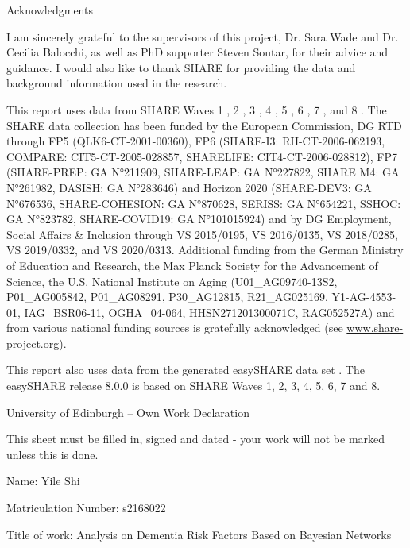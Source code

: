 \documentclass[11pt,twoside]{article}
\numberwithin{Theorem}{section}
\numberwithin{Definition}{section}
\numberwithin{Lemma}{section}
\numberwithin{Algorithm}{section}
\numberwithin{equation}{section}
\begin{document}
\clearpage

\begin{center}
\Large{Acknowledgments}
\end{center}

I am sincerely grateful to the supervisors of this project, Dr. Sara Wade and Dr. Cecilia Balocchi, as well as PhD supporter Steven Soutar, for their advice and guidance. I would also like to thank SHARE for providing the data and background information used in the research. 

This report uses data from SHARE Waves 1 \cite{share1}, 2 \cite{share2}, 3 \cite{share3}, 4 \cite{share4}, 5 \cite{share5}, 6 \cite{share6}, 7 \cite{share7}, and 8 \cite{share8}. The SHARE data collection has been funded by the European Commission, DG RTD through FP5 (QLK6-CT-2001-00360), FP6 (SHARE-I3: RII-CT-2006-062193, COMPARE: CIT5-CT-2005-028857, SHARELIFE: CIT4-CT-2006-028812), FP7 (SHARE-PREP: GA N°211909, SHARE-LEAP: GA N°227822, SHARE M4: GA N°261982, DASISH: GA N°283646) and Horizon 2020 (SHARE-DEV3: GA N°676536, SHARE-COHESION: GA N°870628, SERISS: GA N°654221, SSHOC: GA N°823782, SHARE-COVID19: GA N°101015924) and by DG Employment, Social Affairs \& Inclusion through VS 2015/0195, VS 2016/0135, VS 2018/0285, VS 2019/0332, and VS 2020/0313. Additional funding from the German Ministry of Education and Research, the Max Planck Society for the Advancement of Science, the U.S. National Institute on Aging (U01\_AG09740-13S2, P01\_AG005842, P01\_AG08291, P30\_AG12815, R21\_AG025169, Y1-AG-4553-01, IAG\_BSR06-11, OGHA\_04-064, HHSN271201300071C, RAG052527A) and from various national funding sources is gratefully acknowledged (see \href{www.share-project.org}{www.share-project.org}).

This report also uses data from the generated easySHARE data set \cite{easyshare}. The easySHARE release 8.0.0 is based on SHARE Waves 1, 2, 3, 4, 5, 6, 7 and 8.

\clearpage


\begin{center}
\Large{University of Edinburgh – Own Work Declaration}
\end{center}

This sheet must be filled in, signed and dated - your work will not be marked unless this is done.
\vspace{1cm}

Name: Yile Shi

Matriculation Number: s2168022

Title of work: Analysis on Dementia Risk Factors Based on Bayesian Networks
\end{document}
